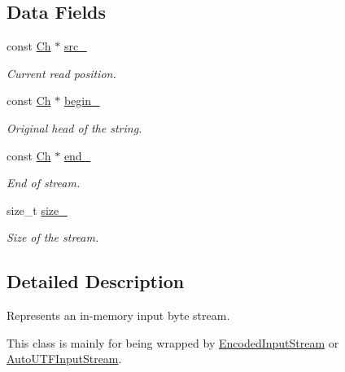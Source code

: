 \subsection*{Data Fields}
\begin{DoxyCompactItemize}
\item 
const \mbox{\hyperlink{structrapidjson_1_1_memory_stream_abf9f7cf51a5830ae45e24f5d55fdceaf}{Ch}} $\ast$ \mbox{\hyperlink{structrapidjson_1_1_memory_stream_ac0b4da6016e5ba6241604fd4258fb722}{src\+\_\+}}
\begin{DoxyCompactList}\small\item\em Current read position. \end{DoxyCompactList}\item 
const \mbox{\hyperlink{structrapidjson_1_1_memory_stream_abf9f7cf51a5830ae45e24f5d55fdceaf}{Ch}} $\ast$ \mbox{\hyperlink{structrapidjson_1_1_memory_stream_a1cc586e50fbfc0bd5994977b42243b93}{begin\+\_\+}}
\begin{DoxyCompactList}\small\item\em Original head of the string. \end{DoxyCompactList}\item 
const \mbox{\hyperlink{structrapidjson_1_1_memory_stream_abf9f7cf51a5830ae45e24f5d55fdceaf}{Ch}} $\ast$ \mbox{\hyperlink{structrapidjson_1_1_memory_stream_a47f45298891e8156121b4017954fabe8}{end\+\_\+}}
\begin{DoxyCompactList}\small\item\em End of stream. \end{DoxyCompactList}\item 
size\+\_\+t \mbox{\hyperlink{structrapidjson_1_1_memory_stream_a8c8437d59c32168a74226312d9e96ace}{size\+\_\+}}
\begin{DoxyCompactList}\small\item\em Size of the stream. \end{DoxyCompactList}\end{DoxyCompactItemize}


\subsection{Detailed Description}
Represents an in-\/memory input byte stream. 

This class is mainly for being wrapped by \mbox{\hyperlink{classrapidjson_1_1_encoded_input_stream}{Encoded\+Input\+Stream}} or \mbox{\hyperlink{classrapidjson_1_1_auto_u_t_f_input_stream}{Auto\+U\+T\+F\+Input\+Stream}}.

